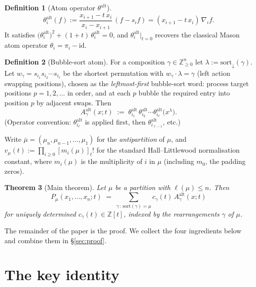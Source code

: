 \documentclass[11pt]{article}
\newtheorem{theorem}{Theorem}
\theoremstyle{definition}
\newtheorem{definition}[theorem]{Definition}
\begin{document}
\begin{definition}[Atom operator $\theta^{\mathrm{alt}}$]\label{def:theta_alt}
\[
\theta_i^{\mathrm{alt}}(f) := \frac{x_{i+1} - t\, x_i}{x_i - x_{i+1}}\,(f - s_i f)
= (x_{i+1} - t\,x_i)\,\nabla_i f.
\]
It satisfies $\bigl(\theta_i^{\mathrm{alt}}\bigr)^2 + (1+t)\,\theta_i^{\mathrm{alt}} = 0$,
and $\theta_i^{\mathrm{alt}}|_{t=0}$ recovers the classical Mason atom operator
$\theta_i = \pi_i - \mathrm{id}$.
\end{definition}

\begin{definition}[Bubble-sort atom]\label{def:atom}
For a composition $\gamma \in \mathbb{Z}_{\geq 0}^n$ let
$\lambda := \mathrm{sort}_\downarrow(\gamma)$. Let
$w_\gamma = s_{i_1} s_{i_2} \cdots s_{i_\ell}$ be the shortest permutation
with $w_\gamma \cdot \lambda = \gamma$ (left action swapping positions), chosen
as the \emph{leftmost-first} bubble-sort word: process target positions
$p = 1, 2, \ldots$ in order, and at each $p$ bubble the required entry
into position $p$ by adjacent swaps. Then
\[
A^{\mathrm{alt}}_\gamma(x;t) \;:=\; \theta_{i_1}^{\mathrm{alt}}\,
  \theta_{i_2}^{\mathrm{alt}}\cdots\theta_{i_\ell}^{\mathrm{alt}}\bigl(x^\lambda\bigr).
\]
(Operator convention: $\theta_{i_\ell}^{\mathrm{alt}}$ is applied first, then
$\theta_{i_{\ell-1}}^{\mathrm{alt}}$, etc.)
\end{definition}

Write $\bar\mu = (\mu_n, \mu_{n-1}, \ldots, \mu_1)$ for the \emph{antipartition}
of $\mu$, and $v_\mu(t) := \prod_{i \ge 0} [m_i(\mu)]_t!$ for the standard
Hall--Littlewood normalisation constant, where $m_i(\mu)$ is the multiplicity
of $i$ in $\mu$ (including $m_0$, the padding zeros).

\begin{theorem}[Main theorem]\label{thm:main}
Let $\mu$ be a partition with $\ell(\mu) \le n$. Then
\begin{equation}\label{eq:main}
P_\mu(x_1, \ldots, x_n; t) \;=\; \sum_{\gamma\,:\,\mathrm{sort}(\gamma)=\mu}
  c_\gamma(t)\, A^{\mathrm{alt}}_\gamma(x;t)
\end{equation}
for uniquely determined $c_\gamma(t) \in \mathbb{Z}[t]$, indexed by
the rearrangements $\gamma$ of $\mu$.
\end{theorem}

The remainder of the paper is the proof. We collect the four ingredients
below and combine them in \S\ref{sec:proof}.

\section{The key identity}
\end{document}
